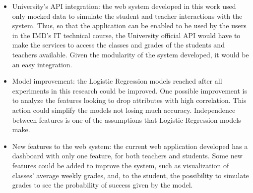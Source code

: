 \begin{itemize}
    \item University's API integration: the web system developed in this work used only mocked data to simulate the student and teacher interactions with the system. Thus, so that the application can be enabled to be used by the users in the IMD's IT technical course, the University official API would have to make the services to access the classes and grades of the students and teachers available. Given the modularity of the system developed, it would be an easy integration.
    \item Model improvement: the Logistic Regression models reached after all experiments in this research could be improved. One possible improvement is to analyze the features looking to drop attributes with high correlation. This action could simplify the models not losing much accuracy. Independence between features is one of the assumptions that Logistic Regression models make.
    \item New features to the web system: the current web application developed has a dashboard with only one feature, for both teachers and students. Some new features could be added to improve the system, such as visualization of classes' average weekly grades, and, to the student, the possibility to simulate grades to see the probability of success given by the model.
\end{itemize}